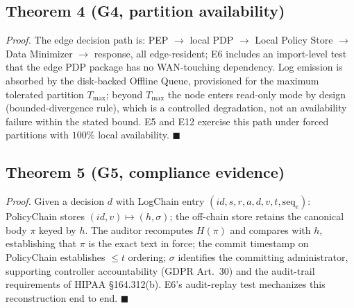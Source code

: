 \documentclass[runningheads]{llncs}
\begin{document}
\subsection*{Theorem 4 (G4, partition availability)}
\emph{Proof.}
The edge decision path is: PEP $\to$ local PDP $\to$ Local Policy Store $\to$ Data Minimizer $\to$ response, all edge-resident; E6 includes an import-level test that the edge PDP package has no WAN-touching dependency. Log emission is absorbed by the disk-backed Offline Queue, provisioned for the maximum tolerated partition $T_{\max}$; beyond $T_{\max}$ the node enters read-only mode by design (bounded-divergence rule), which is a controlled degradation, not an availability failure within the stated bound. E5 and E12 exercise this path under forced partitions with $100\%$ local availability. \hfill$\blacksquare$

\subsection*{Theorem 5 (G5, compliance evidence)}
\emph{Proof.}
Given a decision $d$ with LogChain entry $(\mathit{id},s,r,a,d,v,t,\mathrm{seq}_e)$: PolicyChain stores $(\mathit{id},v)\mapsto(h,\sigma)$; the off-chain store retains the canonical body $\pi$ keyed by $h$. The auditor recomputes $H(\pi)$ and compares with $h$, establishing that $\pi$ is the exact text in force; the commit timestamp on PolicyChain establishes $\leq t$ ordering; $\sigma$ identifies the committing administrator, supporting controller accountability (GDPR Art.~30) and the audit-trail requirements of HIPAA \S164.312(b). E6's audit-replay test mechanizes this reconstruction end to end. \hfill$\blacksquare$
\end{document}
